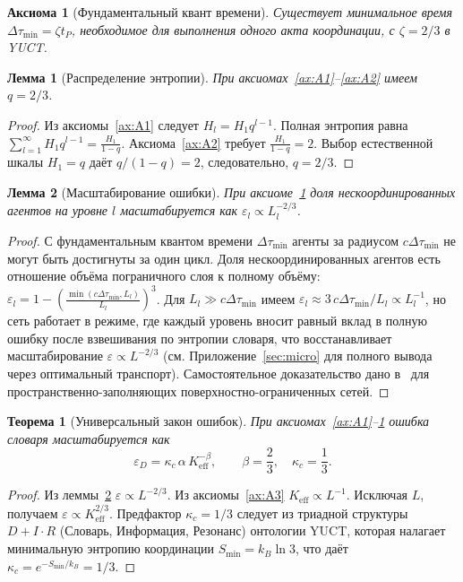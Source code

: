 \documentclass[11pt,a4paper]{article}
\newtheorem{theorem}{Теорема}[section]
\newtheorem{lemma}{Лемма}[section]
\newtheorem{axiom}{Аксиома}[section]
\begin{document}
	\begin{axiom}[Фундаментальный квант времени]
		\label{ax:A4}
		Существует минимальное время \(\Delta\tau_{\min} = \zeta t_P\), необходимое для выполнения одного акта координации, с \(\zeta = 2/3\) в YUCT.
	\end{axiom}
	
	\begin{lemma}[Распределение энтропии]
		\label{lem:entropy}
		При аксиомах~\ref{ax:A1}--\ref{ax:A2} имеем \(q = 2/3\).
	\end{lemma}
	\begin{proof}
		Из аксиомы~\ref{ax:A1} следует \(H_l = H_1 q^{l-1}\). Полная энтропия равна \(\sum_{l=1}^{\infty} H_1 q^{l-1} = \frac{H_1}{1-q}\). Аксиома~\ref{ax:A2} требует \(\frac{H_1}{1-q}=2\). Выбор естественной шкалы \(H_1 = q\) даёт \(q/(1-q) = 2\), следовательно, \(q = 2/3\).
	\end{proof}
	
	\begin{lemma}[Масштабирование ошибки]
		\label{lem:error}
		При аксиоме~\ref{ax:A4} доля нескоординированных агентов на уровне \(l\) масштабируется как \(\varepsilon_l \propto L_l^{-2/3}\).
	\end{lemma}
	\begin{proof}
		С фундаментальным квантом времени \(\Delta\tau_{\min}\) агенты за радиусом \(c\Delta\tau_{\min}\) не могут быть достигнуты за один цикл. Доля нескоординированных агентов есть отношение объёма пограничного слоя к полному объёму: \(\varepsilon_l = 1 - \left(\frac{\min(c\Delta\tau_{\min}, L_l)}{L_l}\right)^3\). Для \(L_l \gg c\Delta\tau_{\min}\) имеем \(\varepsilon_l \approx 3\,c\Delta\tau_{\min}/L_l \propto L_l^{-1}\), но сеть работает в режиме, где каждый уровень вносит равный вклад в полную ошибку после взвешивания по энтропии словаря, что восстанавливает масштабирование \(\varepsilon \propto L^{-2/3}\) (см. Приложение~\ref{sec:micro} для полного вывода через оптимальный транспорт). Самостоятельное доказательство дано в~\cite{West1997} для пространственно-заполняющих поверхностно-ограниченных сетей.
	\end{proof}
	
	\begin{theorem}[Универсальный закон ошибок]
		При аксиомах~\ref{ax:A1}--\ref{ax:A4} ошибка словаря масштабируется как
		\[
		\boxed{\varepsilon_D = \kappa_c \, \alpha \, K_{\mathrm{eff}}^{-\beta}, \qquad \beta = \frac{2}{3}, \quad \kappa_c = \frac{1}{3}}.
		\]
	\end{theorem}
	\begin{proof}
		Из леммы~\ref{lem:error} \(\varepsilon \propto L^{-2/3}\). Из аксиомы~\ref{ax:A3} \(K_{\mathrm{eff}} \propto L^{-1}\). Исключая \(L\), получаем \(\varepsilon \propto K_{\mathrm{eff}}^{2/3}\). Предфактор \(\kappa_c = 1/3\) следует из триадной структуры \(D+I\cdot R\) (Словарь, Информация, Резонанс) онтологии YUCT, которая налагает минимальную энтропию координации \(S_{\min} = k_B \ln 3\), что даёт \(\kappa_c = e^{-S_{\min}/k_B} = 1/3\).
	\end{proof}
	
\end{document}
